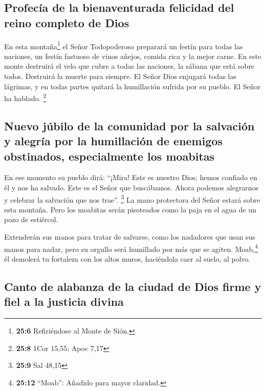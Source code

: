 \hypertarget{profecuxeda-de-la-bienaventurada-felicidad-del-reino-completo-de-dios}{%
\subsection{Profecía de la bienaventurada felicidad del reino completo
de
Dios}\label{profecuxeda-de-la-bienaventurada-felicidad-del-reino-completo-de-dios}}

 En esta montaña\footnote{\textbf{25:6} Refiriéndose al
  Monte de Sión.} el Señor Todopoderoso preparará un festín para todas
las naciones, un festín fastuoso de vinos añejos, comida rica y la mejor
carne.  En este monte destruirá el velo que cubre a todas
las naciones, la sábana que está sobre todos.  Destruirá
la muerte para siempre. El Señor Dios enjugará todas las lágrimas, y en
todas partes quitará la humillación sufrida por su pueblo. El Señor ha
hablado. \footnote{\textbf{25:8} 1Cor 15,55; Apoc 7,17}

\hypertarget{nuevo-juxfabilo-de-la-comunidad-por-la-salvaciuxf3n-y-alegruxeda-por-la-humillaciuxf3n-de-enemigos-obstinados-especialmente-los-moabitas}{%
\subsection{Nuevo júbilo de la comunidad por la salvación y alegría por
la humillación de enemigos obstinados, especialmente los
moabitas}\label{nuevo-juxfabilo-de-la-comunidad-por-la-salvaciuxf3n-y-alegruxeda-por-la-humillaciuxf3n-de-enemigos-obstinados-especialmente-los-moabitas}}

 En ese momento su pueblo dirá: ``¡Mira! Este es nuestro
Dios; hemos confiado en él y nos ha salvado. Este es el Señor que
buscábamos. Ahora podemos alegrarnos y celebrar la salvación que nos
trae''. \footnote{\textbf{25:9} Sal 48,15}  La mano
protectora del Señor estará sobre esta montaña. Pero los moabitas serán
pisoteados como la paja en el agua de un pozo de estiércol.

 Extenderán sus manos para tratar de salvarse, como los
nadadores que usan sus manos para nadar, pero su orgullo será humillado
por más que se agiten.  Moab,\footnote{\textbf{25:12}
  ``Moab'': Añadido para mayor claridad.} él demolerá tu fortaleza con
los altos muros, haciéndola caer al suelo, al polvo.

\hypertarget{canto-de-alabanza-de-la-ciudad-de-dios-firme-y-fiel-a-la-justicia-divina}{%
\subsection{Canto de alabanza de la ciudad de Dios firme y fiel a la
justicia
divina}\label{canto-de-alabanza-de-la-ciudad-de-dios-firme-y-fiel-a-la-justicia-divina}}

